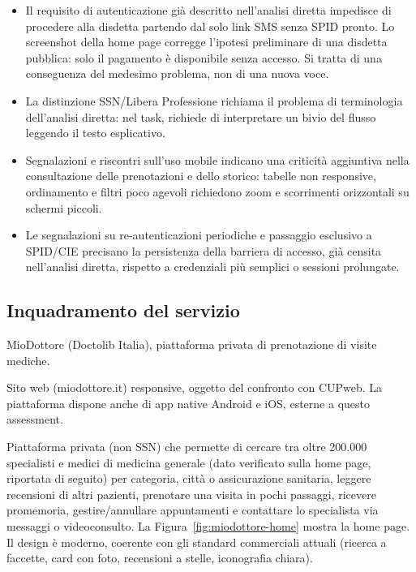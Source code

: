 \begin{itemize}
\item
  Il requisito di autenticazione già descritto nell'analisi diretta
  impedisce di procedere alla disdetta partendo dal solo link SMS senza
  SPID pronto. Lo screenshot della home page corregge l'ipotesi preliminare
  di una disdetta pubblica: solo il pagamento è disponibile senza accesso.
  Si tratta di una conseguenza del medesimo problema, non di una nuova voce.
\item
  La distinzione SSN/Libera Professione richiama il problema di terminologia
  dell'analisi diretta: nel task, richiede di interpretare un bivio del
  flusso leggendo il testo esplicativo.
\item
  Segnalazioni e riscontri sull'uso mobile indicano una criticità aggiuntiva
  nella consultazione delle prenotazioni e dello storico: tabelle non
  responsive, ordinamento e filtri poco agevoli richiedono zoom e
  scorrimenti orizzontali su schermi piccoli.
\item
  Le segnalazioni su re-autenticazioni periodiche e passaggio esclusivo a
  SPID/CIE precisano la persistenza della barriera di accesso, già censita
  nell'analisi diretta, rispetto a credenziali più semplici o sessioni
  prolungate.
\end{itemize}

\label{doc:a:05b}

\subsection{Inquadramento del servizio}


MioDottore (Doctolib Italia), piattaforma privata di prenotazione di
visite mediche.


Sito web (miodottore.it) responsive, oggetto del confronto con CUPweb.
La piattaforma dispone anche di app native Android e iOS, esterne a questo
assessment.


Piattaforma privata (non SSN) che permette di cercare tra oltre
200.000 specialisti e medici di medicina generale (dato verificato
sulla home page, riportata di seguito)
per categoria, città o assicurazione sanitaria, leggere recensioni di
altri pazienti, prenotare una visita in pochi passaggi, ricevere
promemoria, gestire/annullare appuntamenti e contattare lo specialista
via messaggi o videoconsulto. La Figura~\ref{fig:miodottore-home} mostra la home page. Il design è moderno, coerente con gli
standard commerciali attuali (ricerca a faccette, card con foto,
recensioni a stelle, iconografia chiara).

